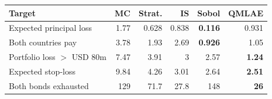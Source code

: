 \begin{tabular}{lrrrrr}\toprule Target & MC & Strat. & IS & Sobol & QMLAE\\\midrule
Expected principal loss & 1.77 & 0.628 & 0.838 & \textbf{0.116} & 0.931\\
Both countries pay & 3.78 & 1.93 & 2.69 & \textbf{0.926} & 1.05\\
Portfolio loss $>$ USD 80m & 7.47 & 3.91 & 3 & 2.57 & \textbf{1.24}\\
Expected stop-loss & 9.84 & 4.26 & 3.01 & 2.64 & \textbf{2.51}\\
Both bonds exhausted & 129 & 71.7 & 27.8 & 148 & \textbf{26}\\
\bottomrule\end{tabular}